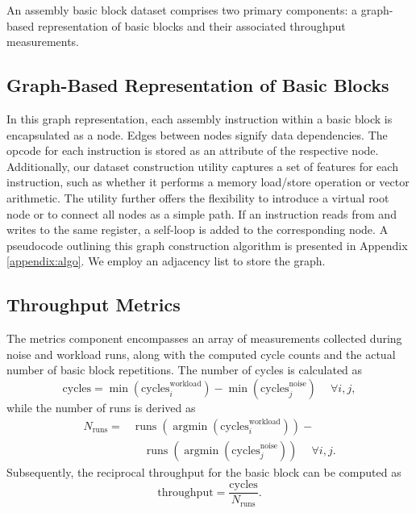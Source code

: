 An assembly basic block dataset comprises two primary components: a graph-based representation of 
basic blocks and their associated throughput measurements.

\subsection{Graph-Based Representation of Basic Blocks}

In this graph representation, each assembly instruction within a basic block is encapsulated as a 
node. Edges between nodes signify data dependencies. The opcode for each instruction is stored as 
an attribute of the respective node. Additionally, our dataset construction utility captures a set 
of features for each instruction, such as whether it performs a memory load/store operation or vector 
arithmetic. The utility further offers the flexibility to introduce a virtual root node or to connect 
all nodes as a simple path. If an instruction reads from and writes to the same register, a 
self-loop is added to the corresponding node. A pseudocode outlining this graph construction algorithm
is presented in Appendix \ref{appendix:algo}. We employ an adjacency list to store the graph.

\subsection{Throughput Metrics}

The metrics component encompasses an array of measurements collected during noise and workload runs, 
along with the computed cycle counts and the actual number of basic block repetitions. The number of 
cycles is calculated as
\[\mathrm{cycles} = \operatorname{min}(\mathrm{cycles}^{\mathrm{workload}}_i) - \operatorname{min}(\mathrm{cycles}^{\mathrm{noise}}_j) \quad ~\forall i, j,\] while the number of runs 
is derived as 
\begin{equation*}
\begin{split}
N_{\mathrm{runs}} = &\operatorname{runs}(\operatorname{argmin}(\mathrm{cycles}^{\mathrm{workload}}_i)) - \\
  &\quad \operatorname{runs}(\operatorname{argmin}(\mathrm{cycles}^{\mathrm{noise}}_j)) \quad ~\forall i, j.
\end{split}
\end{equation*}
Subsequently, the reciprocal throughput for the basic block can be computed as 
\[\mathrm{throughput} = \frac{\mathrm{cycles}}{N_{\mathrm{runs}}}.\]

